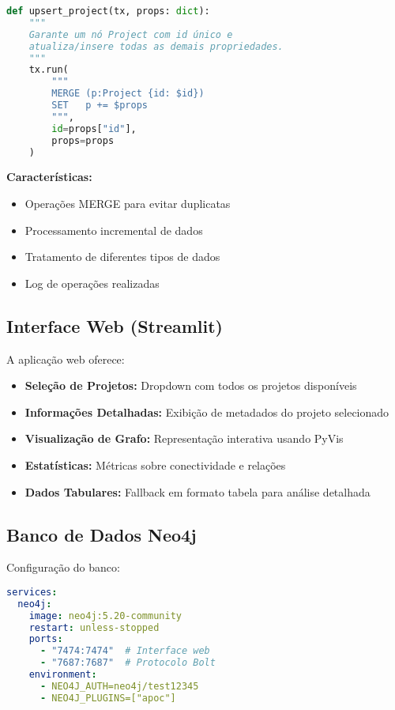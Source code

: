 \documentclass[12pt,a4paper]{article}
\begin{document}
\begin{lstlisting}[language=Python, caption=Função de Upsert de Projetos]
def upsert_project(tx, props: dict):
    """
    Garante um nó Project com id único e
    atualiza/insere todas as demais propriedades.
    """
    tx.run(
        """
        MERGE (p:Project {id: $id})
        SET   p += $props
        """,
        id=props["id"],
        props=props
    )
\end{lstlisting}

\textbf{Características:}
\begin{itemize}
    \item Operações MERGE para evitar duplicatas
    \item Processamento incremental de dados
    \item Tratamento de diferentes tipos de dados
    \item Log de operações realizadas
\end{itemize}

\subsection{Interface Web (Streamlit)}

A aplicação web oferece:

\begin{itemize}
    \item \textbf{Seleção de Projetos:} Dropdown com todos os projetos disponíveis
    \item \textbf{Informações Detalhadas:} Exibição de metadados do projeto selecionado
    \item \textbf{Visualização de Grafo:} Representação interativa usando PyVis
    \item \textbf{Estatísticas:} Métricas sobre conectividade e relações
    \item \textbf{Dados Tabulares:} Fallback em formato tabela para análise detalhada
\end{itemize}

\subsection{Banco de Dados Neo4j}

Configuração do banco:

\begin{lstlisting}[language=yaml, caption=Docker Compose para Neo4j]
services:
  neo4j:
    image: neo4j:5.20-community
    restart: unless-stopped
    ports:
      - "7474:7474"  # Interface web
      - "7687:7687"  # Protocolo Bolt
    environment:
      - NEO4J_AUTH=neo4j/test12345
      - NEO4J_PLUGINS=["apoc"]
\end{lstlisting}
\end{document}
